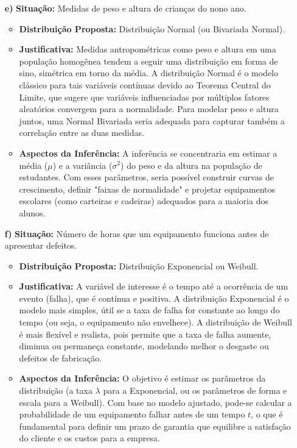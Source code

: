 \documentclass[12pt, a4paper]{article}
\begin{document}
\begin{enumerate}
    \item[\textbf{e)}] \textbf{Situação:} Medidas de peso e altura de crianças do nono ano.
        \begin{itemize}
            \item \textbf{Distribuição Proposta:} Distribuição Normal (ou Bivariada Normal).
            \item \textbf{Justificativa:} Medidas antropométricas como peso e altura em uma população homogênea tendem a seguir uma distribuição em forma de sino, simétrica em torno da média. A distribuição Normal é o modelo clássico para tais variáveis contínuas devido ao Teorema Central do Limite, que sugere que variáveis influenciadas por múltiplos fatores aleatórios convergem para a normalidade. Para modelar peso e altura juntos, uma Normal Bivariada seria adequada para capturar também a correlação entre as duas medidas.
            \item \textbf{Aspectos da Inferência:} A inferência se concentraria em estimar a média ($\mu$) e a variância ($\sigma^2$) do peso e da altura na população de estudantes. Com esses parâmetros, seria possível construir curvas de crescimento, definir "faixas de normalidade" e projetar equipamentos escolares (como carteiras e cadeiras) adequados para a maioria dos alunos.
        \end{itemize}

    \item[\textbf{f)}] \textbf{Situação:} Número de horas que um equipamento funciona antes de apresentar defeitos.
        \begin{itemize}
            \item \textbf{Distribuição Proposta:} Distribuição Exponencial ou Weibull.
            \item \textbf{Justificativa:} A variável de interesse é o tempo até a ocorrência de um evento (falha), que é contínua e positiva. A distribuição Exponencial é o modelo mais simples, útil se a taxa de falha for constante ao longo do tempo (ou seja, o equipamento não envelhece). A distribuição de Weibull é mais flexível e realista, pois permite que a taxa de falha aumente, diminua ou permaneça constante, modelando melhor o desgaste ou defeitos de fabricação.
            \item \textbf{Aspectos da Inferência:} O objetivo é estimar os parâmetros da distribuição (a taxa $\lambda$ para a Exponencial, ou os parâmetros de forma e escala para a Weibull). Com base no modelo ajustado, pode-se calcular a probabilidade de um equipamento falhar antes de um tempo $t$, o que é fundamental para definir um prazo de garantia que equilibre a satisfação do cliente e os custos para a empresa.
        \end{itemize}
\end{enumerate}
\end{document}
